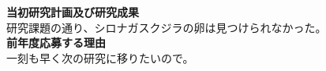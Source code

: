 \documentclass[11pt,a4j,dvipdfmx]{jarticle} 					%
\newcommand{\研究課題名}{象の卵}
\newcommand{\研究機関名}{逢坂大学}
\newcommand{\研究代表者氏名}{湯川秀樹}
\newcommand{\研究期間の最終元号年度}{12}  %
\begin{document}
\newcommand{\最終年度研究種目名}{基盤研究（Z）}
\newcommand{\最終年度研究課題番号}{99999}
\newcommand{\最終年度研究課題名}{シロナガスクジラの卵はなぜ見つけられないのか}
\newcommand{\最終年度研究期間}{令和？？年度〜令和\一年目 年度}


\noindent
\textbf{当初研究計画及び研究成果}\\
	研究課題の通り、シロナガスクジラの卵は見つけられなかった。
\\

\noindent
\textbf{前年度応募する理由}\\
	一刻も早く次の研究に移りたいので。



\end{document}
